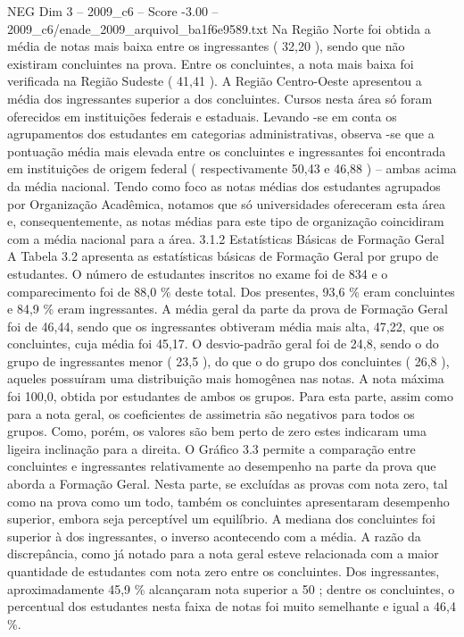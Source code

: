 \begin{textsample}{NEG Dim 3 – 2009\_c6 – Score -3.00 – 2009\_c6/enade\_2009\_arquivol\_ba1f6e9589.txt}
Na Região Norte foi obtida a média de notas mais baixa entre os ingressantes ( 32,20 ), sendo que não existiram concluintes na prova.
Entre os concluintes, a nota mais baixa foi verificada na Região Sudeste ( 41,41 ).
A Região Centro-Oeste apresentou a média dos ingressantes superior a dos concluintes.
Cursos nesta área só foram oferecidos em instituições federais e estaduais.
Levando -se em conta os agrupamentos dos estudantes em categorias administrativas, observa -se que a pontuação média mais elevada entre os concluintes e ingressantes foi encontrada em instituições de origem federal ( respectivamente 50,43 e 46,88 ) – ambas acima da média nacional.
Tendo como foco as notas médias dos estudantes agrupados por Organização Acadêmica, notamos que só universidades ofereceram esta área e, consequentemente, as notas médias para este tipo de organização coincidiram com a média nacional para a área. 3.1.2 Estatísticas Básicas de Formação Geral A Tabela 3.2 apresenta as estatísticas básicas de Formação Geral por grupo de estudantes.
O número de estudantes inscritos no exame foi de 834 e o comparecimento foi de 88,0 \% deste total.
Dos presentes, 93,6 \% eram concluintes e 84,9 \% eram ingressantes.
A média geral da parte da prova de Formação Geral foi de 46,44, sendo que os ingressantes obtiveram média mais alta, 47,22, que os concluintes, cuja média foi 45,17.
O desvio-padrão geral foi de 24,8, sendo o do grupo de ingressantes menor ( 23,5 ), do que o do grupo dos concluintes ( 26,8 ), aqueles possuíram uma distribuição mais homogênea nas notas.
A nota máxima foi 100,0, obtida por estudantes de ambos os grupos.
Para esta parte, assim como para a nota geral, os coeficientes de assimetria são negativos para todos os grupos.
Como, porém, os valores são bem perto de zero estes indicaram uma ligeira inclinação para a direita.
O Gráfico 3.3 permite a comparação entre concluintes e ingressantes relativamente ao desempenho na parte da prova que aborda a Formação Geral.
Nesta parte, se excluídas as provas com nota zero, tal como na prova como um todo, também os concluintes apresentaram desempenho superior, embora seja perceptível um equilíbrio.
A mediana dos concluintes foi superior à dos ingressantes, o inverso acontecendo com a média.
A razão da discrepância, como já notado para a nota geral esteve relacionada com a maior quantidade de estudantes com nota zero entre os concluintes.
Dos ingressantes, aproximadamente 45,9 \% alcançaram nota superior a 50 ; dentre os concluintes, o percentual dos estudantes nesta faixa de notas foi muito semelhante e igual a 46,4 \%.

\end{textsample}
